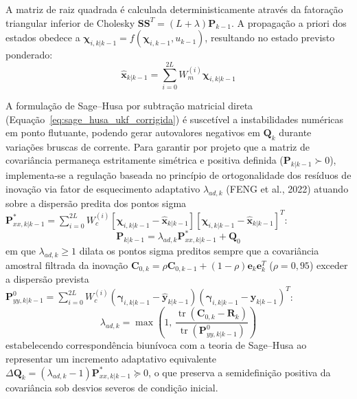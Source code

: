 A matriz de raiz quadrada é calculada deterministicamente através da fatoração triangular inferior de Cholesky $\mathbf{S}\mathbf{S}^T = (L + \lambda)\mathbf{P}_{k-1}$. A propagação a priori dos estados obedece a $\boldsymbol{\chi}_{i, k|k-1} = f(\boldsymbol{\chi}_{i, k-1}, u_{k-1})$, resultando no estado previsto ponderado:
\begin{equation}
    \hat{\mathbf{x}}_{k|k-1} = \sum_{i=0}^{2L} W_m^{(i)} \boldsymbol{\chi}_{i, k|k-1}
\end{equation}

A formulação de Sage--Husa por subtração matricial direta (Equação~\ref{eq:sage_husa_ukf_corrigida}) é suscetível a instabilidades numéricas em ponto flutuante, podendo gerar autovalores negativos em $\mathbf{Q}_k$ durante variações bruscas de corrente. Para garantir por projeto que a matriz de covariância permaneça estritamente simétrica e positiva definida ($\mathbf{P}_{k|k-1} \succ 0$), implementa-se a regulação baseada no princípio de ortogonalidade dos resíduos de inovação via fator de esquecimento adaptativo $\lambda_{ad,k}$ (FENG et al., 2022) atuando sobre a dispersão predita dos pontos sigma $\mathbf{P}_{xx, k|k-1}^* = \sum_{i=0}^{2L} W_c^{(i)} [\boldsymbol{\chi}_{i, k|k-1} - \hat{\mathbf{x}}_{k|k-1}][\boldsymbol{\chi}_{i, k|k-1} - \hat{\mathbf{x}}_{k|k-1}]^T$:
\begin{equation}
    \mathbf{P}_{k|k-1} = \lambda_{ad,k} \mathbf{P}_{xx, k|k-1}^* + \mathbf{Q}_0
    \label{eq:aukf_fading_sigma}
\end{equation}
em que $\lambda_{ad,k} \ge 1$ dilata os pontos sigma preditos sempre que a covariância amostral filtrada da inovação $\mathbf{C}_{0,k} = \rho \mathbf{C}_{0,k-1} + (1 - \rho) \mathbf{e}_k \mathbf{e}_k^T$ ($\rho = 0{,}95$) exceder a dispersão prevista $\mathbf{P}_{yy, k|k-1}^0 = \sum_{i=0}^{2L} W_c^{(i)} (\boldsymbol{\gamma}_{i, k|k-1} - \hat{\mathbf{y}}_{k|k-1})(\boldsymbol{\gamma}_{i, k|k-1} - \hat{\mathbf{y}}_{k|k-1})^T$:
\begin{equation}
    \lambda_{ad,k} = \max\left( 1, \, \frac{\operatorname{tr}\left(\mathbf{C}_{0,k} - \mathbf{R}_k\right)}{\operatorname{tr}\left(\mathbf{P}_{yy, k|k-1}^0\right)} \right)
\end{equation}
estabelecendo correspondência biunívoca com a teoria de Sage--Husa ao representar um incremento adaptativo equivalente $\Delta \mathbf{Q}_k = (\lambda_{ad,k} - 1)\mathbf{P}_{xx, k|k-1}^* \succeq 0$, o que preserva a semidefinição positiva da covariância sob desvios severos de condição inicial.

